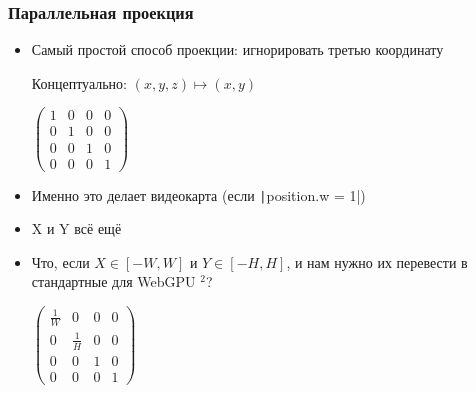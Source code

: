 \documentclass[10pt]{beamer}
\begin{document}
\begin{frame}[fragile]
\frametitle{Параллельная проекция}
\begin{itemize}
\item Самый простой способ проекции: \pause игнорировать третью координату
\begin{center}Концептуально: \begin{math}(x, y, z) \mapsto (x, y)\end{math}\end{center}
\begin{center}
\begin{math}
\begin{pmatrix}
1 & 0 & 0 & 0 \\
0 & 1 & 0 & 0 \\
0 & 0 & 1 & 0 \\
0 & 0 & 0 & 1
\end{pmatrix}
\end{math}
\end{center}
\pause
\item Именно это делает видеокарта (если \texttt|position.w = 1|)
\pause
\item X и Y всё ещё \begin{math}[-1, 1]\end{math}
\pause
\item Что, если \begin{math}X \in [-W, W]\end{math} и \begin{math}Y \in [-H, H]\end{math}, и нам нужно их перевести в стандартные для WebGPU \begin{math}[-1, 1]^2\end{math}?
\pause
\begin{center}
\begin{math}
\begin{pmatrix}
\frac{1}{W} & 0 & 0 & 0 \\
0 & \frac{1}{H} & 0 & 0 \\
0 & 0 & 1 & 0 \\
0 & 0 & 0 & 1
\end{pmatrix}
\end{math}
\end{center}
\end{itemize}
\end{frame}
\end{document}
